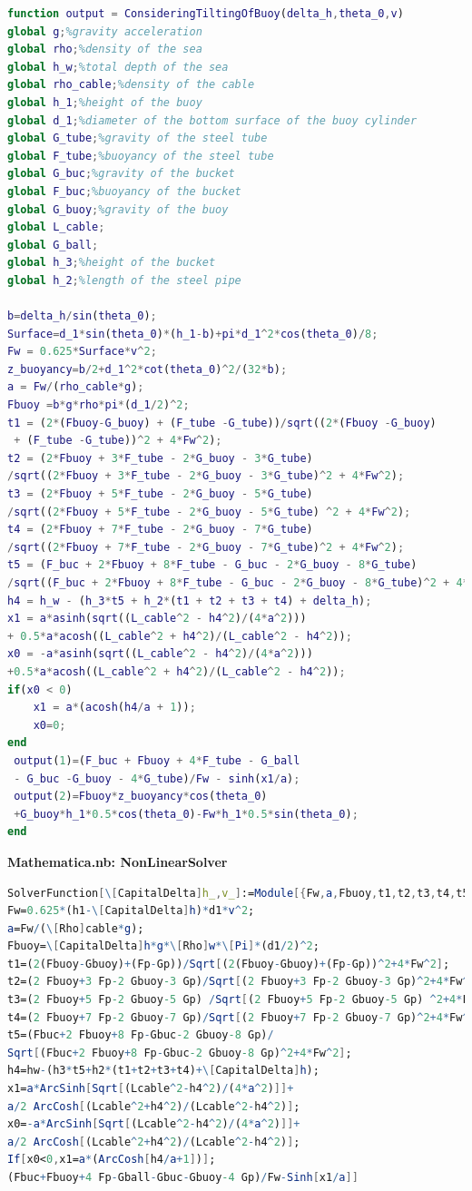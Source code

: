 \documentclass[a4paper,12pt]{ctexart}
\begin{document}
\begin{footnotesize}
\begin{lstlisting}[language=matlab]
function output = ConsideringTiltingOfBuoy(delta_h,theta_0,v)
global g;%gravity acceleration
global rho;%density of the sea
global h_w;%total depth of the sea
global rho_cable;%density of the cable
global h_1;%height of the buoy
global d_1;%diameter of the bottom surface of the buoy cylinder
global G_tube;%gravity of the steel tube
global F_tube;%buoyancy of the steel tube
global G_buc;%gravity of the bucket
global F_buc;%buoyancy of the bucket
global G_buoy;%gravity of the buoy
global L_cable;
global G_ball;
global h_3;%height of the bucket
global h_2;%length of the steel pipe

b=delta_h/sin(theta_0);
Surface=d_1*sin(theta_0)*(h_1-b)+pi*d_1^2*cos(theta_0)/8;
Fw = 0.625*Surface*v^2;
z_buoyancy=b/2+d_1^2*cot(theta_0)^2/(32*b);
a = Fw/(rho_cable*g);
Fbuoy =b*g*rho*pi*(d_1/2)^2;
t1 = (2*(Fbuoy-G_buoy) + (F_tube -G_tube))/sqrt((2*(Fbuoy -G_buoy)
 + (F_tube -G_tube))^2 + 4*Fw^2);
t2 = (2*Fbuoy + 3*F_tube - 2*G_buoy - 3*G_tube)
/sqrt((2*Fbuoy + 3*F_tube - 2*G_buoy - 3*G_tube)^2 + 4*Fw^2);
t3 = (2*Fbuoy + 5*F_tube - 2*G_buoy - 5*G_tube) 
/sqrt((2*Fbuoy + 5*F_tube - 2*G_buoy - 5*G_tube) ^2 + 4*Fw^2);
t4 = (2*Fbuoy + 7*F_tube - 2*G_buoy - 7*G_tube)
/sqrt((2*Fbuoy + 7*F_tube - 2*G_buoy - 7*G_tube)^2 + 4*Fw^2);
t5 = (F_buc + 2*Fbuoy + 8*F_tube - G_buc - 2*G_buoy - 8*G_tube)
/sqrt((F_buc + 2*Fbuoy + 8*F_tube - G_buc - 2*G_buoy - 8*G_tube)^2 + 4*Fw^2);
h4 = h_w - (h_3*t5 + h_2*(t1 + t2 + t3 + t4) + delta_h);
x1 = a*asinh(sqrt((L_cable^2 - h4^2)/(4*a^2))) 
+ 0.5*a*acosh((L_cable^2 + h4^2)/(L_cable^2 - h4^2));
x0 = -a*asinh(sqrt((L_cable^2 - h4^2)/(4*a^2))) 
+0.5*a*acosh((L_cable^2 + h4^2)/(L_cable^2 - h4^2));
if(x0 < 0)
    x1 = a*(acosh(h4/a + 1));
    x0=0;
end
 output(1)=(F_buc + Fbuoy + 4*F_tube - G_ball
 - G_buc -G_buoy - 4*G_tube)/Fw - sinh(x1/a);
 output(2)=Fbuoy*z_buoyancy*cos(theta_0)
 +G_buoy*h_1*0.5*cos(theta_0)-Fw*h_1*0.5*sin(theta_0);
end
\end{lstlisting}

\textbf{Mathematica.nb: NonLinearSolver}

\begin{lstlisting}[language=Mathematica]
SolverFunction[\[CapitalDelta]h_,v_]:=Module[{Fw,a,Fbuoy,t1,t2,t3,t4,t5,h4,x1,x0},
Fw=0.625*(h1-\[CapitalDelta]h)*d1*v^2;
a=Fw/(\[Rho]cable*g);
Fbuoy=\[CapitalDelta]h*g*\[Rho]w*\[Pi]*(d1/2)^2;
t1=(2(Fbuoy-Gbuoy)+(Fp-Gp))/Sqrt[(2(Fbuoy-Gbuoy)+(Fp-Gp))^2+4*Fw^2];
t2=(2 Fbuoy+3 Fp-2 Gbuoy-3 Gp)/Sqrt[(2 Fbuoy+3 Fp-2 Gbuoy-3 Gp)^2+4*Fw^2];
t3=(2 Fbuoy+5 Fp-2 Gbuoy-5 Gp) /Sqrt[(2 Fbuoy+5 Fp-2 Gbuoy-5 Gp) ^2+4*Fw^2];
t4=(2 Fbuoy+7 Fp-2 Gbuoy-7 Gp)/Sqrt[(2 Fbuoy+7 Fp-2 Gbuoy-7 Gp)^2+4*Fw^2];
t5=(Fbuc+2 Fbuoy+8 Fp-Gbuc-2 Gbuoy-8 Gp)/
Sqrt[(Fbuc+2 Fbuoy+8 Fp-Gbuc-2 Gbuoy-8 Gp)^2+4*Fw^2];
h4=hw-(h3*t5+h2*(t1+t2+t3+t4)+\[CapitalDelta]h);
x1=a*ArcSinh[Sqrt[(Lcable^2-h4^2)/(4*a^2)]]+
a/2 ArcCosh[(Lcable^2+h4^2)/(Lcable^2-h4^2)];
x0=-a*ArcSinh[Sqrt[(Lcable^2-h4^2)/(4*a^2)]]+
a/2 ArcCosh[(Lcable^2+h4^2)/(Lcable^2-h4^2)];
If[x0<0,x1=a*(ArcCosh[h4/a+1])];
(Fbuc+Fbuoy+4 Fp-Gball-Gbuc-Gbuoy-4 Gp)/Fw-Sinh[x1/a]]


\end{lstlisting}
\end{footnotesize}
\end{document}
